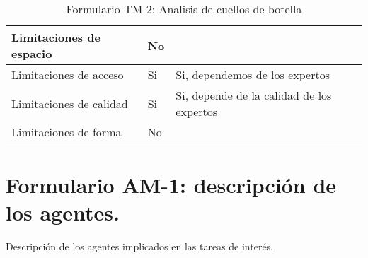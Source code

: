 \begin{table}[H]
{\begin{tabular}{|l|l|l|}
		Limitaciones de espacio& \multicolumn{1}{p{1.0cm}|}{No} & \multicolumn{1}{p{13.0cm}|}{}\\
		\hline

		Limitaciones de acceso& \multicolumn{1}{p{1.0cm}|}{Si} & \multicolumn{1}{p{13.0cm}|}{Si, dependemos de los expertos}\\
		\hline

		Limitaciones de calidad& \multicolumn{1}{p{1.0cm}|}{Si} & \multicolumn{1}{p{13.0cm}|}{Si, depende de la calidad de los expertos}\\
		\hline

		Limitaciones de forma& \multicolumn{1}{p{1.0cm}|}{No} & \multicolumn{1}{p{13.0cm}|}{}\\
		\hline

	  \end{tabular}
	}
	\caption{\label{tab:TM2}Formulario TM-2: Analisis de cuellos de botella}
  \end{table}

\section{Formulario AM-1: descripción de los agentes.}
Descripción de los agentes implicados en las tareas de interés.

\begin{table}[H]
	\centering
	\caption{\label{tab:AM}Formulario AM-1: Analisis de agentes}
  \end{table}






